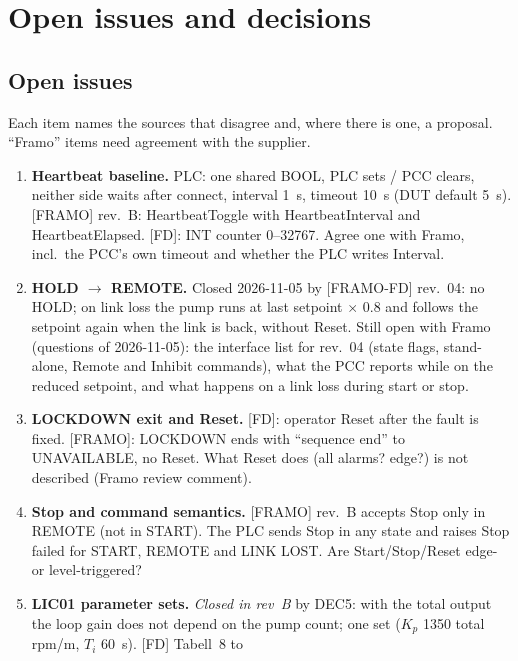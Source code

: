 \documentclass[11pt,a4paper]{article}
\begin{document}
\section{Open issues and decisions}
\label{sec:open}

\subsection{Open issues}
Each item names the sources that disagree and, where there is one, a proposal. ``Framo'' items need
agreement with the supplier.

\begin{small}
\begin{enumerate}[label=\textbf{OI\arabic*}, leftmargin=12mm, itemsep=0.5mm]
  \item \textbf{Heartbeat baseline.} PLC: one shared BOOL, PLC sets / PCC clears, neither side waits after
        connect, interval 1~s, timeout 10~s (DUT default 5~s). [FRAMO] rev.~B: HeartbeatToggle with
        HeartbeatInterval and HeartbeatElapsed. [FD]: INT counter 0--32767. Agree one with Framo, incl.\
        the PCC's own timeout and whether the PLC writes Interval.
  \item \textbf{HOLD $\to$ REMOTE.} Closed 2026-11-05 by [FRAMO-FD] rev.~04: no HOLD; on link loss the
        pump runs at last setpoint $\times$ 0.8 and follows the setpoint again when the link is back, without
        Reset. Still open with Framo (questions of 2026-11-05): the interface list for rev.~04 (state flags,
        stand-alone, Remote and Inhibit commands), what the PCC reports while on the reduced setpoint, and
        what happens on a link loss during start or stop.
  \item \textbf{LOCKDOWN exit and Reset.} [FD]: operator Reset after the fault is fixed. [FRAMO]:
        LOCKDOWN ends with ``sequence end'' to UNAVAILABLE, no Reset. What Reset does (all alarms? edge?)
        is not described (Framo review comment).
  \item \textbf{Stop and command semantics.} [FRAMO] rev.~B accepts Stop only in REMOTE (not in START). The PLC
        sends Stop in any state and raises Stop failed for START, REMOTE and LINK LOST. Are Start/Stop/Reset
        edge- or level-triggered?
  \item \textbf{LIC01 parameter sets.} \emph{Closed in rev~B} by DEC5: with the total output the loop gain
        does not depend on the pump count; one set ($K_p$ 1350 total rpm/m, $T_i$ 60~s). [FD] Tabell~8 to

\end{enumerate}
\end{small}
\end{document}
